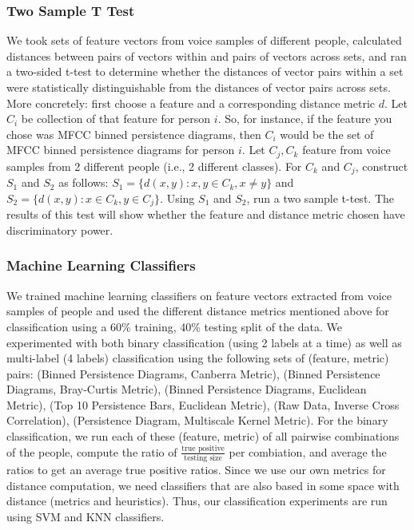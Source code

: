 \documentclass[12pt]{article}
\begin{document}
\subsubsection{Two Sample T Test}
\-\hspace{1cm} We took sets of feature vectors from voice samples of different
people, calculated distances between pairs of vectors within and pairs of
vectors across sets, and ran a two-sided t-test to determine whether the
distances of vector pairs within a set were statistically distinguishable from
the distances of vector pairs across sets. 
\newline \-\hspace{1cm} More concretely: first choose a feature and a
corresponding distance metric $d$. Let $C_i$ be collection of that feature
for person $i$. So, for instance, if the feature you chose was MFCC binned
persistence diagrams, then $C_i$ would be the set of MFCC binned persistence
diagrams for person $i$. Let $C_j, C_k$ feature from voice samples from 2
different people (i.e., 2 different classes).
For $C_k$ and $C_j$, construct $S_1$ and $S_2$ as follows: $S_1 =
\{d(x,y) : x, y \in C_k, x \neq y\}$ and $S_2 = \{d(x,y): x \in C_k, y \in
C_j\}$. Using $S_1$ and $S_2$, run a two sample t-test. The results of this test
will show whether the feature and distance metric chosen have discriminatory
power.
\subsubsection{Machine Learning Classifiers}
\-\hspace{1cm} We trained machine learning classifiers on feature vectors
extracted from voice samples of people and used the different distance metrics
mentioned above for classification using a 60\% training, 40\% testing split of
the data. We experimented with both binary classification (using 2 labels at a
time) as well as multi-label (4 labels) classification using the following sets
of (feature, metric) pairs: (Binned Persistence Diagrams, Canberra Metric),
(Binned Persistence Diagrams, Bray-Curtis Metric), (Binned Persistence
Diagrams, Euclidean Metric), (Top 10 Persistence Bars, Euclidean Metric), (Raw
Data, Inverse Cross Correlation), (Persistence Diagram, Multiscale Kernel
Metric). For the binary classification, we run each of these (feature, metric)
of all pairwise combinations of the people, compute the ratio of
$\frac{\text{true positive}}{\text{testing size}}$ per combiation, and average
the ratios to get an average true positive ratios. Since we use our own
metrics for distance computation, we need classifiers that are also based in
some space with distance (metrics and heuristics). Thus, our classification
experiments are run using SVM and KNN classifiers.
\end{document}
